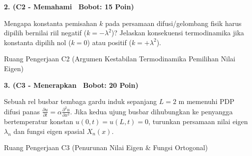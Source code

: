 \documentclass[10pt,a4paper]{article}
\begin{document}
\vspace{1mm}

\noindent\textbf{2. (C2 - Memahami \textbar\ Bobot: 15 Poin)}\par\vspace{0.5mm}
{\footnotesize Mengapa konstanta pemisahan $k$ pada persamaan difusi/gelombang fisik harus dipilih bernilai riil negatif ($k = -\lambda^2$)? Jelaskan konsekuensi termodinamika jika konstanta dipilih nol ($k=0$) atau positif ($k=+\lambda^2$).}
\begin{answerbox}{Ruang Pengerjaan C2 (Argumen Kestabilan Termodinamika Pemilihan Nilai Eigen)}
  \vspace{2.1cm}
\end{answerbox}

\vspace{1mm}

\noindent\textbf{3. (C3 - Menerapkan \textbar\ Bobot: 20 Poin)}\par\vspace{0.5mm}
\noindent\begin{minipage}[t]{0.60\textwidth}%
  {\footnotesize Sebuah rel busbar tembaga gardu induk sepanjang $L=2\text{ m}$ memenuhi PDP difusi panas $\frac{\partial u}{\partial t} = \alpha \frac{\partial^2 u}{\partial x^2}$. Jika kedua ujung busbar dihubungkan ke penyangga bertemperatur konstan $u(0,t) = u(L,t) = 0$, turunkan persamaan nilai eigen $\lambda_n$ dan fungsi eigen spasial $X_n(x)$.}%
\end{minipage}%
\hfill%
\begin{minipage}[t]{0.37\textwidth}%
  \centering
\end{minipage}\par\vspace{1mm}
\begin{answerbox}{Ruang Pengerjaan C3 (Penurunan Nilai Eigen \& Fungsi Ortogonal)}
  \vspace{2.8cm}
\end{answerbox}
\end{document}
